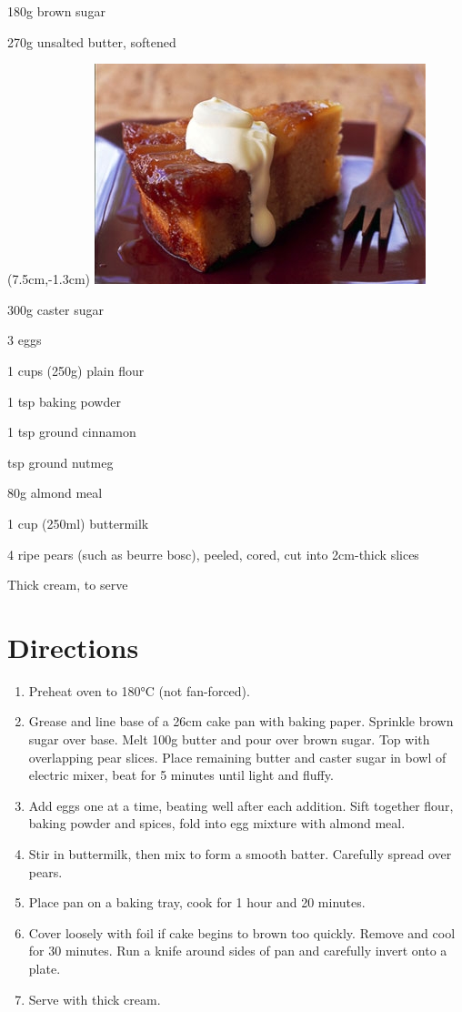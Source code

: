 \begin{ingredients-list}
	\item 180g brown sugar
	\item 270g unsalted butter, softened
		\begin{textblock*}{8cm}(7.5cm,-1.3cm) %
			\includegraphics[scale=0.65]{./img/pear_almond.jpg}
		\end{textblock*}
	\item 300g caster sugar
	\item 3 eggs
	\item 1  cups (250g) plain flour
	\item 1  tsp baking powder
	\item 1 tsp ground cinnamon
	\item {} tsp ground nutmeg
	\item 80g almond meal
	\item 1 cup (250ml) buttermilk
	\item 4 ripe pears (such as beurre bosc), peeled, cored, cut into 2cm-thick slices
	\item Thick cream, to serve 
\end{ingredients-list}

\section*{Directions}
\begin{enumerate}
	\item Preheat oven to 180°C (not fan-forced).
	\item Grease and line base of a 26cm cake pan with baking paper. Sprinkle brown sugar over base.
			Melt 100g butter and pour over brown sugar. Top with overlapping pear slices.
			Place remaining butter and caster sugar in bowl of electric mixer, beat for 5 minutes until light and fluffy.
	\item Add eggs one at a time, beating well after each addition. Sift together flour, baking powder and spices, fold into egg mixture with almond meal.
	\item Stir in buttermilk, then mix to form a smooth batter. Carefully spread over pears.
	\item Place pan on a baking tray, cook for 1 hour and 20 minutes.
	\item Cover loosely with foil if cake begins to brown too quickly. Remove and cool for 30 minutes. Run a knife around sides of pan and carefully invert onto a plate.
	\item Serve with thick cream.
\end{enumerate}

